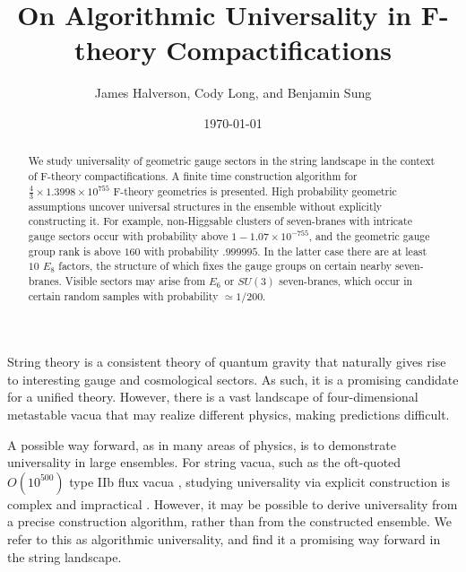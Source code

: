 \documentclass[aps,prl,twocolumn, superscriptaddress,groupedaddress,nofootinbib]{revtex4-1}
\begin{document}
\title{On Algorithmic Universality in F-theory Compactifications}
\author{James Halverson, Cody Long, and Benjamin Sung}

\date{\today}

\begin{abstract}
We study universality of geometric gauge sectors in the string landscape
in the context of F-theory compactifications.
A finite time construction algorithm for $\frac43 \times 1.3998 \times 10^{755}$ F-theory geometries is presented. High probability geometric
assumptions uncover universal structures in the ensemble without
explicitly constructing it. For example, non-Higgsable clusters
of seven-branes with intricate gauge sectors occur with
probability above $1-1.07\times 10^{-755}$,  and
the geometric gauge group rank is above $160$ with probability
$.999995$. In the latter case there are at least $10$ $E_8$
factors, the structure of which fixes the gauge groups
on certain nearby seven-branes. Visible sectors may arise from $E_6$ or $SU(3)$ seven-branes, which occur
in certain random samples with probability $\simeq 1/200$.
\end{abstract}

\maketitle


String theory is a consistent theory of quantum gravity that naturally
gives rise to interesting gauge and cosmological sectors. As
such, it is a promising candidate for a unified theory. However, there is a vast 
landscape of four-dimensional metastable vacua that
may realize different physics, making predictions difficult.


A possible way forward, as in many areas of physics, is to demonstrate
universality in large ensembles. For string vacua, such as the oft-quoted
$O(10^{500})$ type IIb flux vacua
\cite{Bousso:2000xa,*Ashok:2003gk,*Denef:2004ze}, studying universality via
explicit construction is complex and impractical
\cite{Denef:2006ad,*Cvetic:2010ky}. However, it may be possible to derive
universality from a precise construction algorithm, rather than from the
constructed ensemble. We refer to this as algorithmic universality, and find it a
promising way forward in the string landscape.

\end{document}
